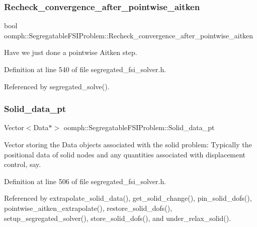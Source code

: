 \subsubsection{\texorpdfstring{Recheck\+\_\+convergence\+\_\+after\+\_\+pointwise\+\_\+aitken}{Recheck\_convergence\_after\_pointwise\_aitken}}
{\footnotesize\ttfamily bool oomph\+::\+Segregatable\+F\+S\+I\+Problem\+::\+Recheck\+\_\+convergence\+\_\+after\+\_\+pointwise\+\_\+aitken\hspace{0.3cm}{\ttfamily [protected]}}



Have we just done a pointwise Aitken step. 



Definition at line 540 of file segregated\+\_\+fsi\+\_\+solver.\+h.



Referenced by segregated\+\_\+solve().

\mbox{\label{classoomph_1_1SegregatableFSIProblem_aca9ab5f800334761ae470453ef476067}} 
\subsubsection{\texorpdfstring{Solid\+\_\+data\+\_\+pt}{Solid\_data\_pt}}
{\footnotesize\ttfamily Vector$<$Data$\ast$$>$ oomph\+::\+Segregatable\+F\+S\+I\+Problem\+::\+Solid\+\_\+data\+\_\+pt\hspace{0.3cm}{\ttfamily [protected]}}



Vector storing the Data objects associated with the solid problem\+: Typically the positional data of solid nodes and any quantities associated with displacement control, say. 



Definition at line 506 of file segregated\+\_\+fsi\+\_\+solver.\+h.



Referenced by extrapolate\+\_\+solid\+\_\+data(), get\+\_\+solid\+\_\+change(), pin\+\_\+solid\+\_\+dofs(), pointwise\+\_\+aitken\+\_\+extrapolate(), restore\+\_\+solid\+\_\+dofs(), setup\+\_\+segregated\+\_\+solver(), store\+\_\+solid\+\_\+dofs(), and under\+\_\+relax\+\_\+solid().

